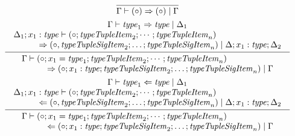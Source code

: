 \begin{gather*}
  \infer{\Gamma \vdash (\circ) \Rightarrow (\circ) \mid \Gamma}{}
  \\
  \infer{
    \begin{array}{l}
      \Gamma \vdash (\circ; x_1 = \mathit{type}_1; \mathit{typeTupleItem}_2; \cdots; \mathit{typeTupleItem}_n)
      \\
      \hspace{3em}\Rightarrow (\circ; x_1: \mathit{type}; \mathit{typeTupleSigItem}_2; \ldots; \mathit{typeTupleSigItem}_n) \mid \Gamma
    \end{array}
  }{
    \begin{array}{c}
      \Gamma \vdash \mathit{type}_1 \Rightarrow \mathit{type} \mid \Delta_1
      \\
      \begin{array}{l}
        \Delta_1; x_1: \mathit{type} \vdash (\circ; \mathit{typeTupleItem}_2; \cdots; \mathit{typeTupleItem}_n)
        \\
        \hspace{3em}\Rightarrow (\circ, \mathit{typeTupleSigItem}_2; \ldots; \mathit{typeTupleSigItem}_n) \mid \Delta; x_1: \mathit{type}; \Delta_2
      \end{array}
    \end{array}
  }
  \\
  \infer{
    \begin{array}{l}
      \Gamma \vdash (\circ; x_1 = \mathit{type}_1; \mathit{typeTupleItem}_2; \cdots; \mathit{typeTupleItem}_n)
      \\
      \hspace{3em}\Leftarrow (\circ; x_1: \mathit{type}; \mathit{typeTupleSigItem}_2; \ldots; \mathit{typeTupleSigItem}_n) \mid \Gamma
    \end{array}
  }{
    \begin{array}{c}
      \Gamma \vdash \mathit{type}_1 \Leftarrow \mathit{type} \mid \Delta_1
      \\
      \begin{array}{l}
        \Delta_1; x_1: \mathit{type} \vdash (\circ; \mathit{typeTupleItem}_2; \cdots; \mathit{typeTupleItem}_n)
        \\
        \hspace{3em}\Leftarrow (\circ, \mathit{typeTupleSigItem}_2; \ldots; \mathit{typeTupleSigItem}_n) \mid \Delta; x_1: \mathit{type}; \Delta_2
      \end{array}
    \end{array}
  }
  \\

\end{gather*}
